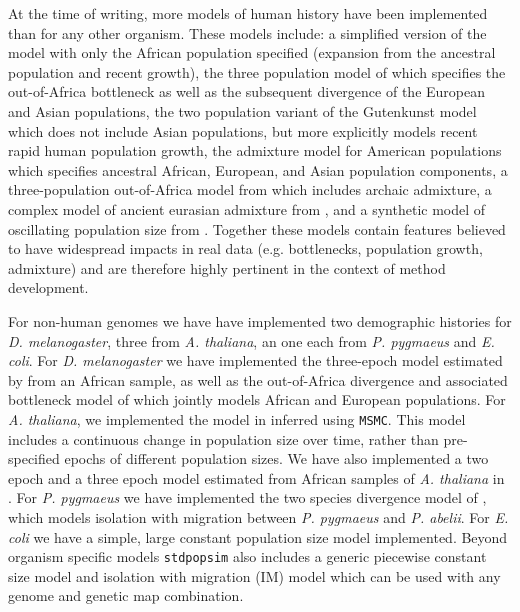\documentclass[12pt,halfline,a4paper]{ouparticle}
\newcommand{\stdpopsim}{\texttt{stdpopsim}\xspace}
\newcommand{\MSMC}{\texttt{MSMC}\xspace}
\begin{document}
At the time of writing, more models of human history have been implemented than for
any other organism. These models include: a simplified version of the \cite{tennessen2012evolution}
model with only the African population specified (expansion from the ancestral
population and recent growth), the three population model of \cite{gutenkunst2009inferring}
which specifies the out-of-Africa bottleneck as well as the subsequent divergence of
the European and Asian populations, the \cite{tennessen2012evolution} two population variant of the
Gutenkunst model which does not include Asian populations, but more explicitly models
recent rapid human population growth, the \cite{browning2018ancestry} admixture model
for American populations which specifies ancestral African, European, and Asian population
components, a three-population out-of-Africa model from \cite{ragsdale2019models}
which includes archaic admixture, a complex model of ancient eurasian admixture from \cite{kamm2019efficiently},
and a synthetic model of oscillating population size from \cite{schiffels2014inferring}.
Together these models
contain features believed to have widespread impacts in real data (e.g. bottlenecks, population growth,
admixture) and are therefore highly pertinent in the context of method development.

For non-human genomes we have have implemented two demographic histories for
\emph{D. melanogaster}, three from \emph{A. thaliana}, an one each from \emph{P. pygmaeus} and \emph{E. coli}.
For \emph{D. melanogaster} we have implemented the three-epoch model estimated by \cite{sheehan2016deep} from
an African sample, as well as the out-of-Africa divergence
and associated bottleneck model of \cite{li2006inferring} which jointly models African
and European populations. For \emph{A. thaliana}, we implemented the
model in \cite{durvasula2017african} inferred using \MSMC. This model includes
a continuous change in population size over time, rather than pre-specified epochs of different
population sizes. We have also implemented a two epoch and a three epoch model estimated from African
samples of \emph{A. thaliana} in \cite{huber2018gene}. For \emph{P. pygmaeus} we have implemented the two
species divergence model of \cite{locke2011comparative}, which models isolation with migration between \emph{P. pygmaeus}
and \emph{P. abelii}. For \emph{E. coli} we have a simple, large constant population size model implemented.
Beyond organism specific models \stdpopsim also includes a generic piecewise constant size model and
isolation with migration (IM) model which can be used with any genome and genetic map combination.
\end{document}
